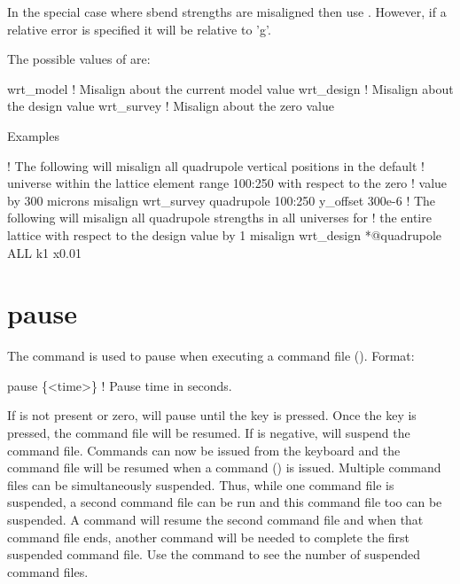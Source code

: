 In the special case where sbend strengths are misaligned then use . However, if a relative error is specified it will be relative to 'g'.

The possible values of  are:
\begin{example}
  wrt_model          ! Misalign about the current model value
  wrt_design         ! Misalign about the design value
  wrt_survey         ! Misalign about the zero value
\end{example}

Examples
\begin{example}
   ! The following will misalign all quadrupole vertical positions in the default
   ! universe within the lattice element range 100:250 with respect to the zero 
   ! value by 300 microns
  misalign wrt_survey quadrupole 100:250 y_offset 300e-6
   ! The following will misalign all quadrupole strengths in all universes for
   ! the entire lattice with respect to the design value by 1%
  misalign wrt_design *@quadrupole ALL k1 x0.01
\end{example}

\section{pause}
\label{s:pause}

The  command is used to pause \tao when executing a command file
(). Format:
\begin{example}
  pause \{<time>\} ! Pause time in seconds.
\end{example}
\vskip 10pt

If  is not present or zero, \tao will pause until the  key is
pressed. Once the  key is pressed, the command file will be resumed. If 
is negative, \tao will suspend the command file. Commands can now be issued from the
keyboard and the command file will be resumed when a  command
() is issued. Multiple command files can be simultaneously suspended.
Thus, while one command file is suspended, a second command file can be run and this
command file too can be suspended. A  command will resume the second command
file and when that command file ends, another  command will be needed to
complete the first suspended command file. Use the  command to see the
number of suspended command files.

